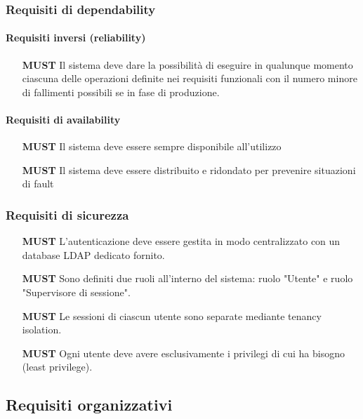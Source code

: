 \documentclass[../main.tex]{subfiles}
\begin{document}
\subsubsection{Requisiti  di  dependability}
\paragraph{Requisiti  inversi  (reliability)}
\begin{itemize}
    \item[\textbf{MUST}] Il sistema deve dare la possibilità di eseguire in qualunque momento ciascuna delle operazioni definite nei requisiti funzionali con il numero minore di fallimenti possibili se in fase di produzione.
\end{itemize}
\paragraph{Requisiti  di  availability}
\begin{itemize}
    \setlength\itemsep{1em}
    \item[\textbf{MUST}] Il sistema deve essere sempre disponibile all'utilizzo
    \item[\textbf{MUST}] Il sistema deve essere distribuito e ridondato per prevenire situazioni di fault
\end{itemize}
\subsubsection{Requisiti  di  sicurezza}
\begin{itemize}
    \setlength\itemsep{1em}
    \item[\textbf{MUST}] L'autenticazione deve essere gestita in modo centralizzato con un database LDAP dedicato fornito.
    \item[\textbf{MUST}] Sono definiti due ruoli all'interno del sistema: ruolo "Utente" e ruolo "Supervisore di sessione". 
    \item[\textbf{MUST}] Le sessioni di ciascun utente sono separate mediante tenancy isolation.
    \item[\textbf{MUST}] Ogni utente deve avere esclusivamente i privilegi di cui ha bisogno (least privilege).
\end{itemize}
\subsection{Requisiti  organizzativi}
\end{document}
